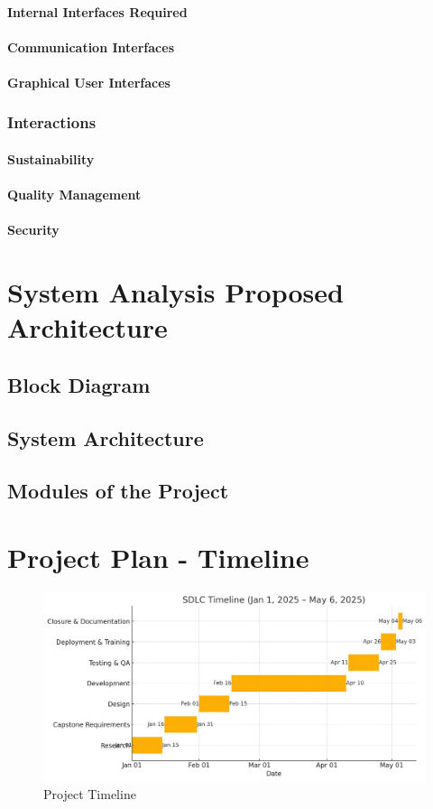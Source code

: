 \documentclass[openany]{report}
\begin{document}
\subsubsection{Internal Interfaces Required}
\subsubsection{Communication Interfaces}
\subsubsection{Graphical User Interfaces}

\subsection{Interactions}
\subsubsection{Sustainability}
\subsubsection{Quality Management}
\subsubsection{Security}

\chapter{System Analysis Proposed Architecture}

\section{Block Diagram}
\section{System Architecture}
\section{Modules of the Project}

\chapter{Project Plan - Timeline}
\begin{figure}[H]
    \centering
    \includegraphics[width=.95\textwidth]{../imgs/timeline.jpg}
    \caption{Project Timeline}
\end{figure}
\end{document}

